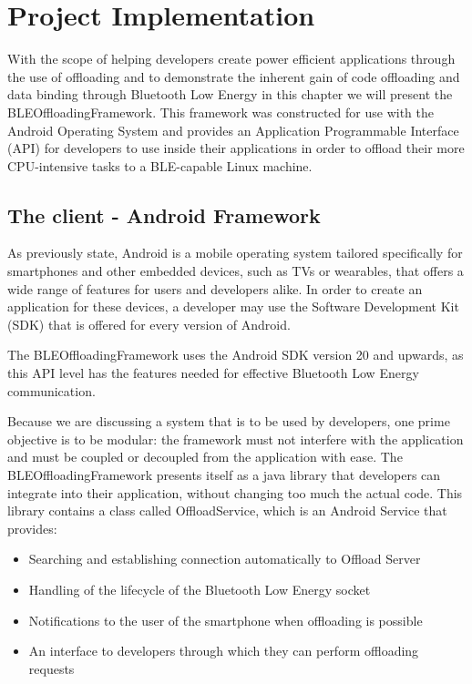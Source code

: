 \chapter{Project Implementation}
\label{chapter:implementation}

With the scope of helping developers create power efficient applications through the use of offloading and to demonstrate the inherent gain of code offloading and data binding through Bluetooth Low Energy in this chapter we will present the BLEOffloadingFramework. This framework was constructed for use with the Android Operating System and provides an Application Programmable Interface (API) for developers to use inside their applications in order to offload their more CPU-intensive tasks to a BLE-capable Linux machine.


\section{The client - Android Framework}

As previously state, Android is a mobile operating system tailored specifically for smartphones and other embedded devices, such as TVs or wearables, that offers a wide range of features for users and developers alike. In order to create an application for these devices, a developer may use the Software Development Kit (SDK)  that is offered for every version of Android.

The BLEOffloadingFramework uses the Android SDK version 20 and upwards, as this API level has the features needed for effective Bluetooth Low Energy communication.

Because we are discussing a system that is to be used by developers, one prime objective is to be modular: the framework must not interfere with the application and must be coupled or decoupled from the application with ease. The BLEOffloadingFramework presents itself as a java library that developers can integrate into their application, without changing too much the actual code. This library contains a class called OffloadService, which is an Android Service that provides:

\begin{itemize}

\item{Searching and establishing connection automatically to Offload Server}

\item{Handling of the lifecycle of the Bluetooth Low Energy socket}

\item{Notifications to the user of the smartphone when offloading is possible}

\item{An interface to developers through which they can perform offloading requests}

\end{itemize}


